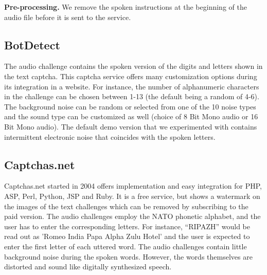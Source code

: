 
\textbf{Pre-processing.} We remove the spoken instructions at the beginning of the audio file
before it is sent to the service.


\subsection{BotDetect}

The audio challenge contains the spoken version of the digits and letters shown in the text captcha.
This captcha service offers many customization options during its integration in a website. For instance, 
the number of alphanumeric characters in the challenge can be chosen between
1-13 (the default being a random of 4-6). The background noise can be random or selected from one of 
the 10 noise types and the sound type can be customized as well (choice of 8 Bit Mono audio or 16 Bit 
Mono audio). The default demo version that we experimented with contains intermittent electronic noise that 
coincides with the spoken letters.

\subsection{Captchas.net}

Captchas.net started in 2004 offers implementation and easy integration for PHP, ASP, Perl, 
Python, JSP and Ruby. It is a free service, but shows a watermark on the images of the text challenges 
which can be removed by subscribing to the paid version. 
The audio challenges employ the NATO phonetic alphabet, and the user has to enter the corresponding letters.
For instance, ``RIPAZH'' would be read out as 'Romeo India Papa Alpha Zulu Hotel' and the user is expected 
to enter the first letter of each uttered word. The audio challenges contain little background noise during the 
spoken words. However, the words themselves are distorted and sound like digitally synthesized speech.

